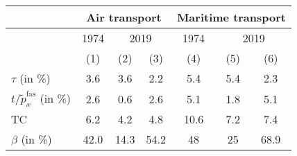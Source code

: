\begin{tabular}{l|c|cc||c|cc}
& \multicolumn{3}{|c||}{Air transport} & \multicolumn{3}{|c}{Maritime transport} \\ \hline
& 1974 & \multicolumn{2}{|c||}{2019} & 1974 & \multicolumn{2}{|c}{2019}\\
& (1) & (2) &  (3) & (4) & (5) & (6) \\ \hline

$\tau$ (in \%) & 3.6 & 3.6 & 2.2 & 5.4 & 5.4 & 2.3\\
$t/\widetilde{p}^{\text{fas}}_x$ (in \%) & 2.6 & 0.6 & 2.6 & 5.1 & 1.8 & 5.1 \\
TC & 6.2 & 4.2 & 4.8 & 10.6 & 7.2 & 7.4 \\
$\beta$ (in \%) & 42.0 & 14.3 & 54.2 & 48 & 25 & 68.9 \\
\hline \hline
\end{tabular} 